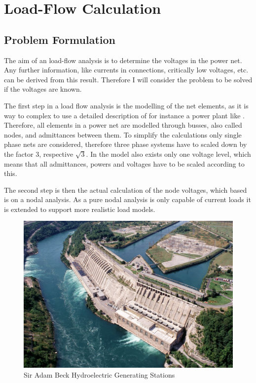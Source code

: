 \chapter{Load-Flow Calculation}

\section{Problem Formulation}

The aim of an load-flow analysis is to determine the voltages in the power net. Any further information, like currents in connections, critically low voltages, etc. can be derived from this result. Therefore I will consider the problem to be solved if the voltages are known.

The first step in a load flow analysis is the modelling of the net elements, as it is way to complex to use a detailed description of for instance a power plant like . Therefore, all elements in a power net are modelled through busses, also called nodes, and admittances between them. To simplify the calculations only single phase nets are considered, therefore three phase systems have to scaled down by the factor 3, respective $\sqrt{3}$. In the model also exists only one voltage level, which means that all admittances, powers and voltages have to be scaled according to this.

The second step is then the actual calculation of the node voltages, which based is on a nodal analysis. As a pure nodal analysis is only capable of current loads it is extended to support more realistic load models.

\begin{figure}
	\includegraphics[width=\textwidth]{figures/adam_beck_complex.jpg}
	\caption{Sir Adam Beck Hydroelectric Generating Stations \citep{adam_back_complex}}
	\label{fig:power_plant}
\end{figure}

